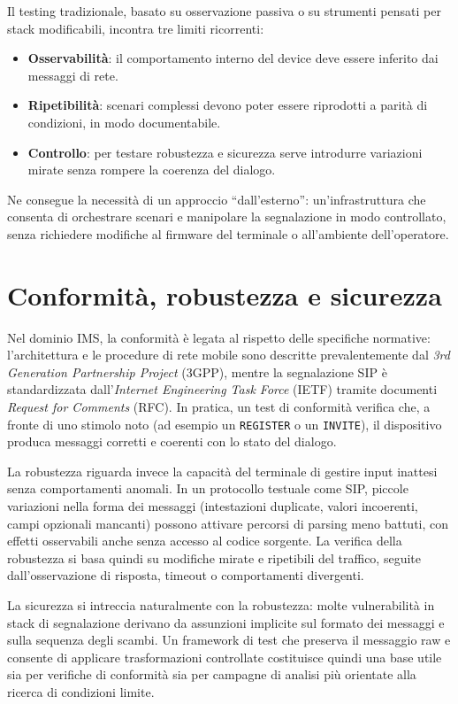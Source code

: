 Il testing tradizionale, basato su osservazione passiva o su strumenti pensati per stack modificabili, incontra tre limiti ricorrenti:
\begin{itemize}
	\item \textbf{Osservabilit\`a}: il comportamento interno del device deve essere inferito dai messaggi di rete.
	\item \textbf{Ripetibilit\`a}: scenari complessi devono poter essere riprodotti a parit\`a di condizioni, in modo documentabile.
	\item \textbf{Controllo}: per testare robustezza e sicurezza serve introdurre variazioni mirate senza rompere la coerenza del dialogo.
\end{itemize}

Ne consegue la necessit\`a di un approccio ``dall'esterno'': un'infrastruttura che consenta di orchestrare scenari e manipolare la segnalazione in modo controllato, senza richiedere modifiche al firmware del terminale o all'ambiente dell'operatore.

\section{Conformit\`a, robustezza e sicurezza}
Nel dominio IMS, la conformit\`a \`e legata al rispetto delle specifiche normative: l'architettura e le procedure di rete mobile sono descritte prevalentemente dal \emph{3rd Generation Partnership Project} (3GPP), mentre la segnalazione SIP \`e standardizzata dall'\emph{Internet Engineering Task Force} (IETF) tramite documenti \emph{Request for Comments} (RFC). In pratica, un test di conformit\`a verifica che, a fronte di uno stimolo noto (ad esempio un \texttt{REGISTER} o un \texttt{INVITE}), il dispositivo produca messaggi corretti e coerenti con lo stato del dialogo.

La robustezza riguarda invece la capacit\`a del terminale di gestire input inattesi senza comportamenti anomali. In un protocollo testuale come SIP, piccole variazioni nella forma dei messaggi (intestazioni duplicate, valori incoerenti, campi opzionali mancanti) possono attivare percorsi di parsing meno battuti, con effetti osservabili anche senza accesso al codice sorgente. La verifica della robustezza si basa quindi su modifiche mirate e ripetibili del traffico, seguite dall'osservazione di risposta, timeout o comportamenti divergenti.

La sicurezza si intreccia naturalmente con la robustezza: molte vulnerabilit\`a in stack di segnalazione derivano da assunzioni implicite sul formato dei messaggi e sulla sequenza degli scambi. Un framework di test che preserva il messaggio raw e consente di applicare trasformazioni controllate costituisce quindi una base utile sia per verifiche di conformit\`a sia per campagne di analisi pi\`u orientate alla ricerca di condizioni limite.

